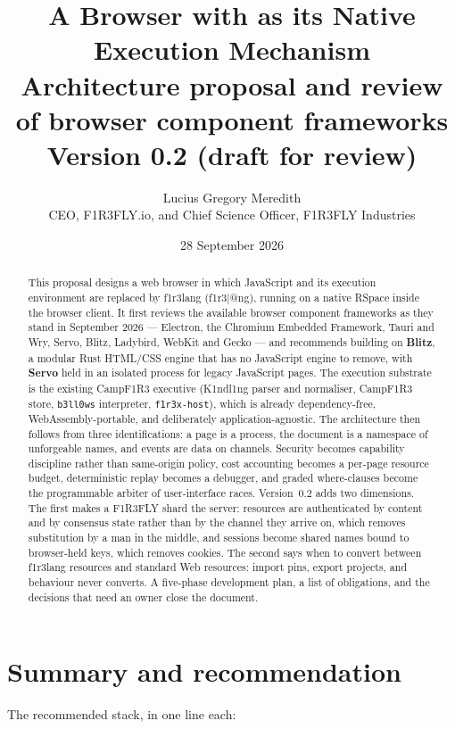 \documentclass[11pt]{article}
\title{\textbf{A Browser with \fl{} as its Native Execution Mechanism}\\[4pt]
\large Architecture proposal and review of browser component frameworks\\[6pt]
\normalsize Version 0.2 (draft for review)}
\author{Lucius Gregory Meredith\\
\small CEO, F1R3FLY.io, and Chief Science Officer, F1R3FLY Industries}
\date{28 September 2026}
\theoremstyle{definition}
\theoremstyle{remark}
\newcommand{\fl}{f1r3lang}
\newcommand{\Camp}{CampF1R3}
\newcommand{\Kind}{K1ndl1ng}
\newcommand{\code}[1]{\texttt{#1}}
\begin{document}
\maketitle

\begin{abstract}
\noindent
This proposal designs a web browser in which JavaScript and its execution
environment are replaced by \fl{} (f1r3|@ng), running on a native RSpace inside the
browser client. It first reviews the available browser component frameworks as they
stand in September 2026 --- Electron, the Chromium Embedded Framework, Tauri and
Wry, Servo, Blitz, Ladybird, WebKit and Gecko --- and recommends building on
\textbf{Blitz}, a modular Rust HTML/CSS engine that has no JavaScript engine to
remove, with \textbf{Servo} held in an isolated process for legacy JavaScript pages.
The execution substrate is the existing \Camp{} executive (\Kind{} parser and
normaliser, \Camp{} store, \code{b3ll0ws} interpreter, \code{f1r3x-host}), which is
already dependency-free, WebAssembly-portable, and deliberately
application-agnostic. The architecture then follows from three identifications: a
page is a process, the document is a namespace of unforgeable names, and events are
data on channels. Security becomes capability discipline rather than same-origin
policy, cost accounting becomes a per-page resource budget, deterministic replay
becomes a debugger, and graded where-clauses become the programmable arbiter of
user-interface races. Version~0.2 adds two dimensions. The first makes a
F1R3FLY shard the server: resources are authenticated by content and by consensus
state rather than by the channel they arrive on, which removes substitution by a man in
the middle, and sessions become shared names bound to browser-held keys, which removes
cookies. The second says when to convert between \fl{} resources and standard Web
resources: import pins, export projects, and behaviour never converts. A five-phase development plan, a list of obligations, and the
decisions that need an owner close the document.
\end{abstract}

\tableofcontents

\section{Summary and recommendation}\label{sec:summary}

The recommended stack, in one line each:
\end{document}
